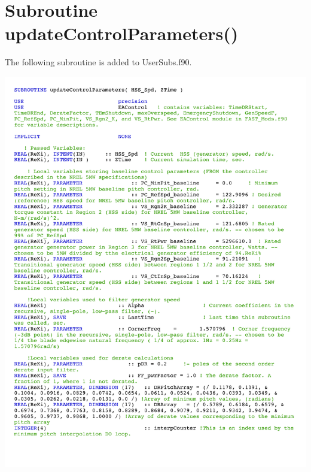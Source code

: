 \section{Subroutine updateControlParameters()} \label{sectionD-3}
The following subroutine is added to UserSubs.f90.

\noindent
\includegraphics[width=\linewidth]{Figures/AppendixDFigures/figD-3A.pdf}

